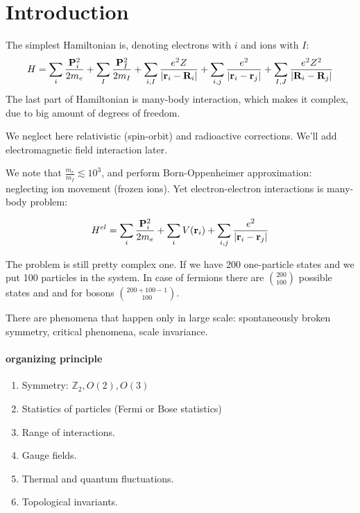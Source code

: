 \section{Introduction}
The simplest Hamiltonian is, denoting electrons with $i$ and ions with $I$: 
\begin{align}
H = \sum_i \frac{\vb{P}_i^2}{2m_e} +  \sum_I \frac{\vb{P}_I^2}{2m_I} +  \sum_{i,I} \frac{e^2Z}{\abs{\vb{r}_i - \vb{R}_i}} +  \sum_{i,j} \frac{e^2}{\abs{\vb{r}_i - \vb{r}_j}}+  \sum_{I,J} \frac{e^2Z^2}{\abs{\vb{R}_i - \vb{R}_j}}
\end{align}
The last part of Hamiltonian is many-body interaction, which makes it complex, due to big amount of degrees of freedom. 

We neglect here relativistic (spin-orbit) and radioactive corrections. We'll add electromagnetic field interaction later.

We note that $\frac{m_e}{m_I} \lesssim 10^3$, and perform Born-Oppenheimer approximation: neglecting ion movement (frozen ions). Yet electron-electron interactions is many-body problem:

\begin{align}
H^{el} = \sum_i \frac{\vb{P}_i^2}{2m_e} +  \sum_i V\qty(\vb{r}_i) + \sum_{i,j} \frac{e^2}{\abs{\vb{r}_i - \vb{r}_j}}
\end{align}

The problem is still pretty complex one. If we have 200 one-particle states and we put 100 particles in the system. In case of fermions there are $\binom{200}{100}$ possible states and and for bosons $\binom{200+100-1}{100}$.

There are phenomena that happen only in large scale: spontaneously broken symmetry, critical phenomena, scale invariance.

\paragraph{organizing principle}
\begin{enumerate}
	\item Symmetry: $\mathbb{Z}_2, O(2), O(3)$
	\item Statistics of particles (Fermi or Bose statistics)
	\item Range of interactions.
	\item Gauge fields. 
	\item Thermal and quantum fluctuations.
	\item Topological invariants.
\end{enumerate}

